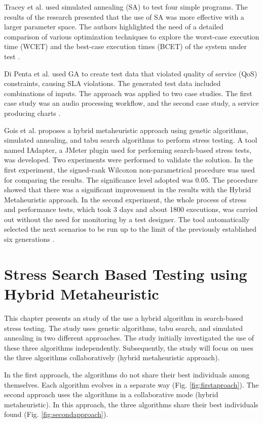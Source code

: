 \documentclass[espaco=umemeio,chapter=TITLE,twoside,openright]{abnt}
\begin{document}
Tracey et al. \cite{Tracey1998} used simulated annealing (SA) to test four
simple programs. The results of the research presented that the use of SA was more effective with a larger parameter space. The authors highlighted the need of a detailed comparison of various optimization techniques to explore the worst-case execution time (WCET) and the best-case execution times (BCET) of the system under test \cite{Tracey1998}.

Di Penta et al. \cite{Penta2007} used GA to create test data that violated quality of service (QoS) constraints, causing SLA violations. The generated test data included combinations of inputs. The approach was applied to two case studies. The first case study was an audio processing workflow, and the second case study, a service producing charts \cite{Penta2007}.


Gois et al. proposes a hybrid metaheuristic approach using genetic algorithms, simulated annealing, and tabu search algorithms to perform stress testing. A tool named IAdapter, a JMeter plugin used for performing search-based stress tests, was developed. Two experiments were performed to validate the solution. In the first experiment, the signed-rank Wilcoxon non-parametrical procedure was used for comparing the results. The significance level adopted was 0.05. The procedure showed that there was a significant improvement in the results with the Hybrid Metaheuristic approach.
In the second experiment, the whole process of stress and performance tests, which took 3 days and about 1800 executions, was carried out without the need for monitoring by a test designer. The tool automatically selected the next scenarios to be run up to the limit of the previously established six generations \cite{Gois2016}.

\chapter{Stress Search Based Testing using Hybrid Metaheuristic}

This chapter presents an study of the use a hybrid algorithm in search-based stress testing. The study uses genetic algorithms, tabu search, and simulated annealing in two different approaches. The study initially investigated the use of these three algorithms independently. Subsequently, the study will focus on  uses the three algorithms collaboratively (hybrid metaheuristic approach).

In the first approach, the algorithms do not share their best individuals among themselves. Each algorithm evolves in a separate way (Fig. \ref{fig:firstaproach}). The second approach uses the algorithms in a collaborative mode (hybrid metaheuristic). In this approach, the three algorithms share their best individuals found (Fig. \ref{fig:secondapproach}). 
\end{document}

